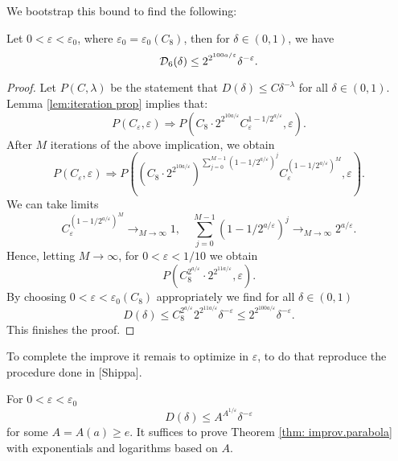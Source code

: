 We bootstrap this bound to find the following:
\begin{lem}
\label{lem:IntermediateResultMomentCurveIII}
Let $0<\varepsilon<\varepsilon_{0}$, where $\varepsilon_{0}=\varepsilon_{0}(C_{8})$, then for $\delta \in (0,1)$, we have
\begin{equation*}
\mathcal{D}_6(\delta) \leq 2^{2^{100a/\varepsilon}} \delta^{-\varepsilon}.
\end{equation*}
\end{lem}
\begin{proof}
Let $P(C,\lambda)$ be the statement that $D(\delta) \leq C \delta^{-\lambda}$ for all $\delta \in (0,1)$. Lemma \ref{lem:iteration prop} implies that:
\begin{equation*}
P(C_\varepsilon,\varepsilon) \Rightarrow P(C_{8} \cdot 2^{2^{10 a/\varepsilon}} C_\varepsilon^{1-1/2^{a/\varepsilon}}, \varepsilon).
\end{equation*}
After $M$ iterations of the above implication, we obtain
\begin{equation*}
P(C_\varepsilon,\varepsilon) \Rightarrow P((C_{8} \cdot 2^{2^{10 a/\varepsilon}} )^{\sum_{j=0}^{M-1} (1-1/2^{a/\varepsilon})^j} C_\varepsilon^{(1-1/2^{a/\varepsilon})^M}, \varepsilon).
\end{equation*}
We can take limits
\begin{equation*}
C_\varepsilon^{(1-1/2^{a/\varepsilon})^M} \rightarrow_{M \to \infty} 1, \quad \sum_{j=0}^{M-1} (1-1/2^{a/\varepsilon})^j \rightarrow_{M \to \infty} 2^{a/\varepsilon}.
\end{equation*}
Hence, letting $M \to \infty$, for $0<\varepsilon<1/10$ we obtain
\begin{equation*}
P(C_{8}^{2^{a/\varepsilon}} \cdot 2^{ 2^{11a/\varepsilon}}, \varepsilon).
\end{equation*}
By choosing  $0<\varepsilon<\varepsilon_0(C_{8})$ appropriately we find for all $\delta \in (0,1)$
\begin{equation*}
D(\delta) \leq C_{8}^{2^{a/\varepsilon}} 2^{2^{11 a/\varepsilon} } \delta^{-\varepsilon} \leq 2^{2^{100 a/\varepsilon}} \delta^{-\varepsilon}.
\end{equation*}
This finishes the proof.
\end{proof}
To complete the improve it remais to optimize in $\varepsilon$, to do that reproduce the procedure done in [Shippa].

For $0<\varepsilon<\varepsilon_0$
\begin{equation}
\label{eq:TripleExponentialBoundII}
D(\delta) \leq A^{A^{1/\varepsilon}} \delta^{-\varepsilon}
\end{equation}
for some $A=A(a) \geq e$. It suffices to prove Theorem \ref{thm: improv.parabola} with exponentials and logarithms based on $A$.


